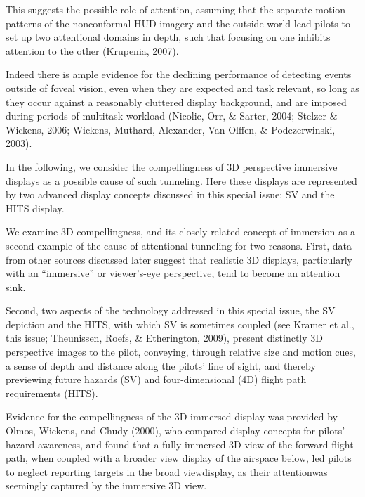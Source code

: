\documentclass[utf8,bachelor,manualbib]{gradu3}
\begin{document}
This suggests the possible role of attention, assuming that the separate motion patterns of the nonconformal HUD imagery and the outside world lead pilots to set up two attentional domains in depth, such that focusing on one inhibits attention to the other (Krupenia, 2007).








Indeed there is ample evidence for the declining performance of detecting events outside of foveal vision, even when they are expected and task relevant, so long as they occur against a reasonably cluttered display background, and are imposed during periods of multitask workload (Nicolic, Orr, \& Sarter, 2004; Stelzer \& Wickens, 2006; Wickens, Muthard, Alexander, Van Olffen, \& Podczerwinski, 2003).

In the following, we consider the compellingness of 3D perspective immersive displays as a possible cause of such tunneling. Here these displays are represented by two advanced display concepts discussed in this special issue: SV and the HITS display.

We examine 3D compellingness, and its closely related concept of immersion as a second example of the cause of attentional tunneling for two reasons. First, data from other sources discussed later suggest that realistic 3D displays, particularly with an “immersive” or viewer’s-eye perspective, tend to become an attention sink.

Second, two aspects of the technology addressed in this special issue, the SV depiction
and the HITS, with which SV is sometimes coupled (see Kramer et al., this issue; Theunissen, Roefs, \& Etherington, 2009), present distinctly 3D perspective images to the pilot, conveying, through relative size and motion cues, a sense of depth and distance along the pilots’ line of sight, and thereby previewing future hazards (SV) and four-dimensional (4D) flight path requirements (HITS).






Evidence for the compellingness of the 3D immersed display was provided by Olmos, Wickens, and Chudy (2000), who compared display concepts for pilots’ hazard awareness, and found that a fully immersed 3D view of the forward flight path, when coupled with a broader view display of the airspace below, led pilots to neglect reporting targets in the broad viewdisplay, as their attentionwas seemingly captured by the immersive 3D view.
\end{document}
